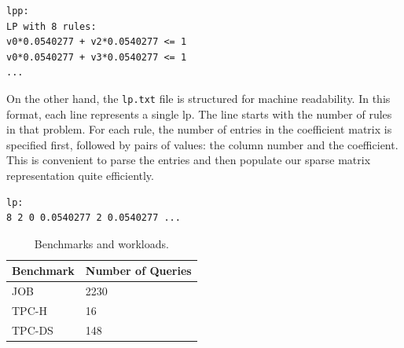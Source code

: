\begin{lstlisting}
lpp:
LP with 8 rules:
v0*0.0540277 + v2*0.0540277 <= 1
v0*0.0540277 + v3*0.0540277 <= 1
...
\end{lstlisting}

On the other hand, the \texttt{lp.txt} file is structured for machine readability.
In this format, each line represents a single \gls{lp}. The line starts with
the number of rules in that problem. For each rule, the number of entries in
the coefficient matrix is specified first, followed by pairs of values:
the column number and the coefficient. This is convenient to parse the entries
and then populate our sparse matrix representation quite efficiently.

\begin{lstlisting}
lp:
8 2 0 0.0540277 2 0.0540277 ...
\end{lstlisting}
\begin{table}[!h]
    \centering
    \caption{Benchmarks and workloads.}
    \begin{tabular}{|l|l|}
        \hline
        Benchmark                                & Number of Queries \\
        \hline
        JOB \parencite{10.14778/2850583.2850594} & 2230              \\
        TPC-H \parencite{tpch}                   & 16                \\
        TPC-DS \parencite{tpcds2022}             & 148               \\
        \hline
    \end{tabular}
\end{table}

